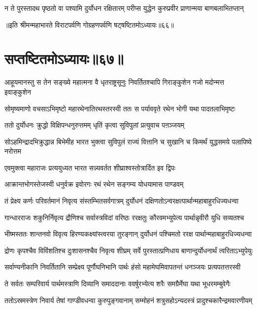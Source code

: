 \twolineshloka
{न ते पुरस्तादथ पृष्ठतो वा पश्यामि दुर्योधन रक्षितारम्}
{परीप्स युद्धेन कुरुप्रवीर प्राणान्मया बाणबलाभितप्तान्}

॥इति श्रीमन्महाभारते विराटपर्वणि गोग्रहणपर्वणि षट्षष्टितमोऽध्यायः॥६६॥

\chapter{सप्तष्टितमोऽध्यायः॥६७॥}
\fourlineindentedshloka
{आहूयमानस्तु स तेन सङ्ख्ये}
{महात्मना वै धृतराष्ट्रसूनुः}
{निवर्तितश्चापि गिराङ्कुशेन}
{गजो मदोन्मत्त इवाङ्कुशेन}


\twolineshloka
{सोमृष्यमाणो वचसाऽभिमृष्टो महारथेनातिरथस्तरस्वी}
{ततः स पर्याववृते रथेन भोगी यथा पादतलाभिमृष्टः}


\twolineshloka
{ततो दुर्योधनः क्रुद्धो विक्षिपन्धनुरुत्तमम्}
{धृतिं कृत्वा सुविपुलां प्रत्युवाच पऩञ्जयम्}


\threelineshloka
{सोऽहमिन्द्रादभिक्रुद्धान्न बिभेमीह भारत}
{भुक्त्वा सुविपुलं राज्यं वित्तानि च सुखानि च}
{किमर्थं युद्धसमये पलापिष्ये नरोत्तम}


\twolineshloka
{एवमुक्त्वा महाराजः प्रत्ययुध्यत भारत}
{सन्न्यवर्तत शीघ्राश्वस्तोत्रार्दित इव द्विपः}


\twolineshloka
{आक्रान्तभोगस्तेजस्वी धनुर्वक्र इवोरगः}
{रथं रथेन सङ्गम्य योधयामास पाण्डवम्}


\twolineshloka
{तं प्रेक्ष्य कर्णः परिवर्तमानं निवृत्य संस्तम्भितसर्वगात्रम्}
{दुर्योधनं दक्षिणतोऽन्वरक्षत्पार्थान्महाबाहुरधिज्यधन्वा}


\twolineshloka
{गान्धारराजः शकुनिर्निवृत्य द्रौणिश्च सर्वास्त्रविदां वरिष्ठः}
{ररक्षतुः कौरवमभ्युपेत्य पार्थान्नृवीरौ युधि सव्यतश्च}


\twolineshloka
{भीष्मस्ततः शान्तनवो विवृत्य हिरण्यकक्ष्यांस्त्वरया तुरङ्गान्}
{दुर्योधनं पश्चिमतो ररक्ष पार्थान्महाबाहुरधिज्यधन्वा}


\twolineshloka
{द्रोणः कृपश्चैव विविंशतिश्च दुःशासनश्चैव निवृत्य शीघ्रम्}
{सर्वे पुरस्तात्प्रणिधाय बाणान्दुर्योधनार्थं त्वरिताऽभ्युपेयुः}


\twolineshloka
{सर्वाण्यनीकानि निवर्तितानि सम्प्रेक्ष्य पूर्णौघनिभानि पार्थः}
{हंसो महामेघमिवापतन्तं धनञ्जयः प्रत्यपतत्तरस्वी}


\twolineshloka
{ते सर्वतः सम्परिवार्य पार्थमस्त्राणि दिव्यानि समाददानाः}
{ववर्षुरभ्येत्य शरैः समग्रैर्मेघा यथा भूधरमम्बुवेगैः}


\twolineshloka
{ततोऽस्रमस्त्रेण निवार्य तेषां गाण्डीवधन्वा कुरुपुङ्गवानाम्}
{सम्मोहनं शत्रुसहोऽन्यदस्त्रं प्रादुश्चकारैन्द्रमवारणीयम्}



